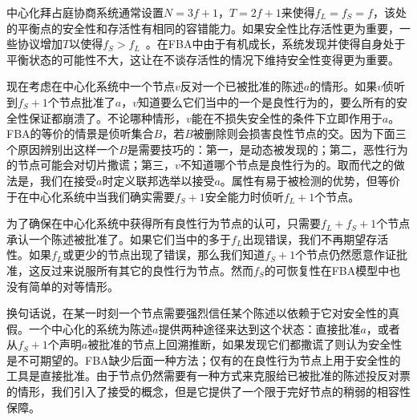 中心化拜占庭协商系统通常设置$N=3f+1$，$T=2f+1$来使得$f_L=f_S=f$，该处的平衡点的安全性和存活性有相同的容错能力。如果安全性比存活性更为重要，一些协议增加$T$以使得$f_S>f_L$~\cite{Li:2007:BOF:1973430.1973440}。在FBA中由于{\quorum}有机成长，系统发现并使得自身处于平衡状态的可能性不大，这让在不谈存活性的情况下维持安全性变得更为重要。

现在考虑在中心化系统中一个节点$v$反对一个已被批准的陈述$a$的情形。如果$v$侦听到$f_S+1$个节点批准了$a$，$v$知道要么它们当中的一个是良性行为的，要么所有的安全性保证都崩溃了。不论哪种情形，$v$能在不损失安全性的条件下立即作用于$a$。FBA的等价的情景是侦听集合$B$，若$B$被删除则会损害良性节点的{\quorum}交。因为下面三个原因辨别出这样一个$B$是需要技巧的：第一，{\quorum}是动态被发现的；第二，恶性行为的节点可能会对切片撒谎；第三，$v$不知道哪个节点是良性行为的。取而代之的做法是，我们在{\vblock}接受$a$时定义联邦选举以接受$a$。{\vblock}属性有易于被检测的优势，但等价于在中心化系统中当我们确实需要$f_S+1$安全能力时侦听$f_L+1$个节点。

为了确保在中心化系统中获得所有良性行为节点的认可，只需要$f_L+f_S+1$个节点承认一个陈述被批准了。如果它们当中的多于$f_L$出现错误，我们不再期望存活性。如果$f_L$或更少的节点出现了错误，那么我们知道$f_S+1$个节点仍然愿意作证批准，这反过来说服所有其它的良性行为节点。然而$f_S$的可恢复性在FBA模型中也没有简单的对等情形。

换句话说，在某一时刻一个节点需要强烈信任某个陈述以依赖于它对安全性的真假。一个中心化的系统为陈述$a$提供两种途径来达到这个状态：直接批准$a$，或者从$f_S+1$个声明$a$被批准的节点上回溯推断，如果发现它们都撒谎了则认为安全性是不可期望的。FBA缺少后面一种方法；仅有的在良性行为节点上用于安全性的工具是直接批准。由于节点仍然需要有一种方式来克服给已被批准的陈述投反对票的情形，我们引入了接受的概念，但是它提供了一个限于完好节点的稍弱的相容性保障。
